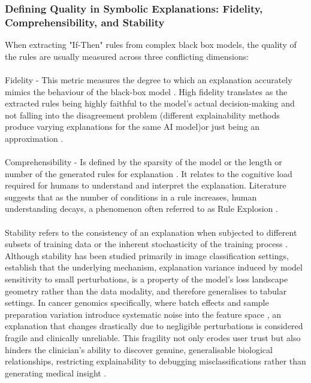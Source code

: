  
\subsubsection{Defining Quality in Symbolic Explanations: Fidelity, Comprehensibility, and Stability}
When extracting "If-Then" rules from complex black box models, the quality of the rules are usually measured 
across three conflicting dimensions:
\\\\
Fidelity - This metric measures the degree to which an explanation accurately mimics the behaviour of 
the black-box model \cite{Guidotti2021}. High fidelity translates as the extracted rules being highly faithful 
to the model’s actual decision-making and not falling into the disagreement problem (different explainability 
methods produce varying explanations for the same AI model)or just being an approximation \cite{Miro2025}.
\\\\
Comprehensibility - Is defined by the sparsity of the model or the length or number of the generated 
rules for explanation \cite{Arrieta2020,Yedjour2024}. It relates to the cognitive load required 
for humans to understand and interpret the explanation. Literature suggests that as the number of conditions 
in a rule increases, human understanding decays, a phenomenon often referred to as Rule Explosion 
\cite{Arrieta2020,Yedjour2024}.
\\\\
Stability refers to the consistency of an explanation when subjected to different subsets of 
training data or the inherent stochasticity of the training process \cite{Ye2024}. Although 
stability has been studied primarily in image classification settings, \cite{Ye2024} establish that 
the underlying mechanism, explanation variance induced by model sensitivity to small perturbations, is a 
property of the model's loss landscape geometry rather than the data modality, and therefore generalises to 
tabular settings. In cancer genomics specifically, where batch effects and sample preparation variation 
introduce systematic noise into the feature space \cite{Partin2023}, an explanation that changes drastically 
due to negligible perturbations is considered fragile and clinically unreliable. This fragility not only erodes user 
trust \cite{Wicker2022} but also hinders the clinician's ability to discover genuine, generalisable biological 
relationships, restricting explainability to debugging misclassifications rather than generating medical insight \cite{Ye2024}. 

